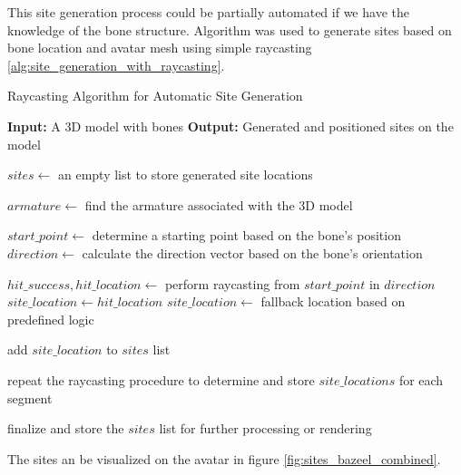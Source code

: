 \documentclass[../../main.tex]{subfiles}
\begin{document}
This site generation process could be partially automated if we have the knowledge of the bone structure. Algorithm was used to generate sites based on bone location and avatar mesh using simple raycasting \ref{alg:site_generation_with_raycasting}.

\begin{algorithm}
    \label{alg:site_generation_with_raycasting}
    \caption{Raycasting Algorithm for Automatic Site Generation}
    \begin{algorithmic}
        \State \textbf{Input:} A 3D model with bones
        \State \textbf{Output:} Generated and positioned sites on the model

        \State $sites \gets$ an empty list to store generated site locations

        \State {}

        \State $armature \gets$ find the armature associated with the 3D model

            \State $start\_point \gets$ determine a starting point based on the bone's position
            \State $direction \gets$ calculate the direction vector based on the bone's orientation
            
            \State $hit\_success, hit\_location \gets$ perform raycasting from $start\_point$ in $direction$
                \State $site\_location \gets hit\_location$
            \Else
                \State $site\_location \gets$ fallback location based on predefined logic
            \EndIf

            \State add $site\_location$ to $sites$ list
            
            \State {}
        \EndFor

                \State repeat the raycasting procedure to determine and store $site\_locations$ for each segment
            \EndFor
        \EndFor

        \State finalize and store the $sites$ list for further processing or rendering
    \end{algorithmic}
\end{algorithm}

The sites an be visualized on the avatar in figure \ref{fig:sites_bazeel_combined}.
\end{document}
